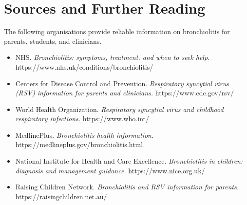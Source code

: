 \section*{Sources and Further Reading}
The following organisations provide reliable information on bronchiolitis for parents, students, and clinicians.

\begin{itemize}
    \item NHS. \textit{Bronchiolitis: symptoms, treatment, and when to seek help.} https://www.nhs.uk/conditions/bronchiolitis/
    \item Centers for Disease Control and Prevention. \textit{Respiratory syncytial virus (RSV) information for parents and clinicians.} https://www.cdc.gov/rsv/
    \item World Health Organization. \textit{Respiratory syncytial virus and childhood respiratory infections.} https://www.who.int/
    \item MedlinePlus. \textit{Bronchiolitis health information.} https://medlineplus.gov/bronchiolitis.html
    \item National Institute for Health and Care Excellence. \textit{Bronchiolitis in children: diagnosis and management guidance.} https://www.nice.org.uk/
    \item Raising Children Network. \textit{Bronchiolitis and RSV information for parents.} https://raisingchildren.net.au/
\end{itemize}
